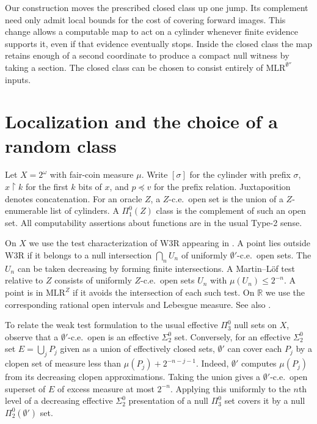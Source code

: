 \documentclass[12pt,reqno]{amsart}
\newcommand{\Cantor}{2^\omega}
\newcommand{\WThree}{\mathrm{W3R}}
\newcommand{\MLR}{\mathrm{MLR}}
\newcommand{\pre}{\mathbin{\upharpoonright}}
\newcommand{\RR}{\mathbb R}
\newcommand{\mass}{\mu}
\newcommand{\jump}{\emptyset'}
\newcommand{\djump}{\emptyset''}
\begin{document}
Our construction moves the prescribed closed class up one jump. Its
complement need only admit local bounds for the cost of covering forward
images. This change allows a computable map to act on a cylinder whenever
finite evidence supports it, even if that evidence eventually stops.
Inside the closed class the map retains enough of a second coordinate
to produce a compact null witness by taking a section. The closed class
can be chosen to consist entirely of $\MLR^{\djump}$ inputs.

\section{Localization and the choice of a random class}\label{sec:application}

Let $X=\Cantor$ with fair-coin measure $\mass$. Write $[\sigma]$ for the
cylinder with prefix $\sigma$, $x\pre k$ for the first $k$ bits of $x$, and
$p\preceq v$ for the prefix relation. Juxtaposition denotes concatenation.
For an oracle $Z$, a $Z$-c.e.\ open set is the union of a $Z$-enumerable
list of cylinders. A $\Pi^0_1(Z)$ class is the complement of such an open
set. All computability assertions about functions are in the usual Type-2
sense.

On $X$ we use the test characterization of $\WThree$ appearing in
\cite[Open Question~29]{PWY}. A point lies outside $\WThree$ if it belongs
to a null intersection $\bigcap_n U_n$ of uniformly $\jump$-c.e.\ open
sets. The $U_n$ can be taken decreasing by forming finite intersections.
A Martin--L\"of test relative to $Z$ consists of uniformly $Z$-c.e.\ open
sets $U_n$ with $\mass(U_n)\le 2^{-n}$. A point is in $\MLR^Z$ if it
avoids the intersection of each such test. On $\RR$ we use the corresponding
rational open intervals and Lebesgue measure. See also \cite{DH}.

To relate the weak test formulation to the usual effective
$\Pi^0_3$ null sets on $X$, observe that a $\jump$-c.e.\ open is an
effective $\Sigma^0_2$ set. Conversely, for an effective $\Sigma^0_2$
set $E=\bigcup_j P_j$ given as a union of effectively closed sets,
$\jump$ can cover each $P_j$ by a clopen set of measure less than
$\mass(P_j)+2^{-n-j-1}$. Indeed, $\jump$ computes $\mass(P_j)$ from
its decreasing clopen approximations. Taking the union gives a
$\jump$-c.e.\ open superset of $E$ of excess measure at most $2^{-n}$.
Applying this uniformly to the $n$th level of a decreasing effective
$\Sigma^0_2$ presentation of a null $\Pi^0_3$ set covers it by a null
$\Pi^0_2(\jump)$ set.
\end{document}
